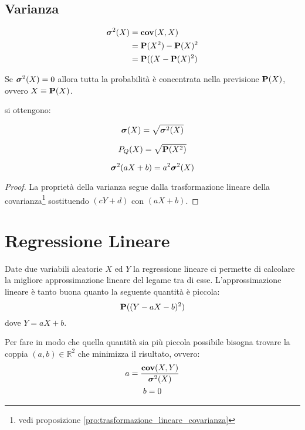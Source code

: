 
\subsection{Varianza} %
\begin{definition}[Varianza]\label{def:varianza}
  \begin{align*}
    \boldsymbol\sigma^2(X) &= \mathbf{cov}(X,X) \\
    &= \mathbf{P}(X^2) - \mathbf{P}(X)^2 \\
    &= \mathbf{P}((X - \mathbf{P}(X)^2)
  \end{align*}
\end{definition}
Se \( \boldsymbol\sigma^2(X) = 0 \) allora tutta la probabilità è concentrata nella previsione \( \mathbf{P}(X) \), ovvero \( X \equiv \mathbf{P}(X) \).

 si ottengono:
\begin{definition}\label{def:scarto_quadratico_medio}
  \[ \boldsymbol\sigma(X) = \sqrt{\boldsymbol\sigma^2(X)} \]
\end{definition}

\begin{definition}\label{def:previsione_quadratica}
  \[ P_Q(X) = \sqrt{\mathbf{P}(X^2)} \]
\end{definition}

\begin{proposition}
  \label{pro:trasformazione_lineare_varianza}
  \[ \boldsymbol\sigma^2(aX + b) = a^2 \boldsymbol\sigma^2(X) \]
\end{proposition}

\begin{proof}
  La proprietà della varianza segue dalla trasformazione lineare della covarianza\footnote{vedi proposizione \ref{pro:trasformazione_lineare_covarianza}} sostituendo \( (cY + d) \) con \( (aX + b) \).
\end{proof}


\section{Regressione Lineare} %
\begin{definition}
  Date due variabili aleatorie $X$ ed $Y$ la regressione lineare ci permette di calcolare la migliore approssimazione lineare del legame tra di esse.
  L'approssimazione lineare è tanto buona quanto la seguente quantità è piccola:
  \[ \mathbf{P}((Y - aX - b)^2) \]
  dove \( Y = aX + b \). %

  Per fare in modo che quella quantità sia più piccola possibile bisogna trovare la coppia \( (a,b) \in \mathbb{R}^2 \) che minimizza il risultato, ovvero:
  \begin{gather*}
    a = \frac{\mathbf{cov}(X,Y)}{\boldsymbol\sigma^2(X)} \\
    b = 0
  \end{gather*}
\end{definition}

